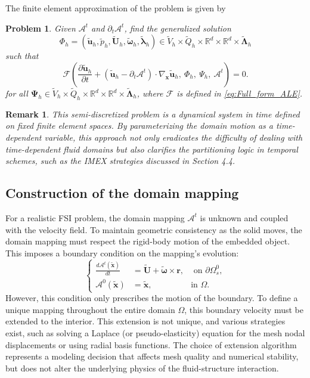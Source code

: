 \documentclass{article}
\newcommand{\bU}{{\mathbf{U}}}
\newcommand{\bx}{{\mathbf{x}}}
\newcommand\tu{{\tilde{\mathbf{u}}}}
\newcommand\tU{{\tilde{\mathbf{U}}}}
\newcommand\tp{{\tilde{{p}}}}
\newcommand\tomega{{\tilde{\boldsymbol{\omega}}}}
\newtheorem{problem}{Problem}
\newtheorem{remark}[theorem]{Remark}
\begin{document}
The finite element approximation of the problem is given by
\begin{problem}
Given $\mathcal{A}^t$ and $\partial_t \mathcal{A}^t$, find the generalized solution 
\[
{\Phi}_h =(\tu_h, \tp_h, \tilde{\bU}_h, \tilde{\boldsymbol{\omega}}_h, \tilde{\boldsymbol{\lambda}}_h) \in \tilde{V}_h \times \tilde{Q}_h \times \mathbb{R}^d \times \mathbb{R}^d \times \tilde{\boldsymbol{\Lambda}}_h
\]
such that
\begin{equation}\label{eq:general_ALE}
\mathcal{F}\left( 
\frac{\partial \tu_h}{\partial t} + (\tu_h - \partial_t \mathcal{A}^t) \cdot \nabla_{\bx} \tu_h,\ 
{\Phi}_h,\ 
{\Psi}_h,\ 
\mathcal{A}^t 
\right) = 0.
\end{equation}
for all $\boldsymbol{\Psi}_h \in \tilde{V}_h \times \tilde{Q}_h \times \mathbb{R}^d \times \mathbb{R}^d \times \tilde{\boldsymbol{\Lambda}}_h$, where $\mathcal{F}$ is defined in \eqref{eq:Full_form_ALE}.
\end{problem}
\begin{remark}
  This semi-discretized problem is a dynamical system in time defined on fixed finite element spaces. By parameterizing the domain motion as a time-dependent variable, this approach not only eradicates the difficulty of dealing with time-dependent fluid domains but also clarifies the partitioning logic in temporal schemes, such as the IMEX strategies discussed in Section 4.4.
\end{remark}

\subsection{Construction of the domain mapping}
For a realistic FSI problem, the domain mapping $\mathcal{A}^t$ is unknown and coupled with the velocity field. To maintain geometric consistency as the solid moves, the domain mapping must respect the rigid-body motion of the embedded object. This imposes a boundary condition on the mapping's evolution:
\begin{equation}
    \left\{
    \begin{aligned}
    \frac{d\mathcal{A}^t(\tilde{\mathbf{x}})}{dt} &= \tU + \tomega\times\mathbf{r}, &\text{ on } \partial\Omega_s^0,\\
    \mathcal{A}^0(\tilde{\mathbf{x}}) &= \tilde{\mathbf{x}},&\text{in }\Omega.
    \end{aligned}
    \right.
\end{equation}
However, this condition only prescribes the motion of the boundary. To define a unique mapping throughout the entire domain $\Omega$, this boundary velocity must be extended to the interior. This extension is not unique, and various strategies exist, such as solving a Laplace (or pseudo-elasticity) equation for the mesh nodal displacements or using radial basis functions. The choice of extension algorithm represents a modeling decision that affects mesh quality and numerical stability, but does not alter the underlying physics of the fluid-structure interaction.
\end{document}
